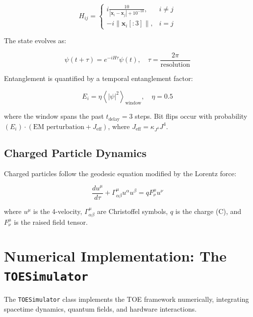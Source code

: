 \documentclass[12pt]{article}
\begin{document}
\begin{equation}
H_{ij} = \begin{cases} 
i \frac{10}{|\mathbf{x}_i - \mathbf{x}_j| + 10^{-10}}, & i \neq j \\
-i \|\mathbf{x}_i[:3]\|, & i = j 
\end{cases}
\label{eq:tetrahedral_hamiltonian}
\end{equation}

The state evolves as:

\begin{equation}
\psi(t + \tau) = e^{-i H \tau} \psi(t), \quad \tau = \frac{2\pi}{\text{resolution}}
\label{eq:quantum_evolution}
\end{equation}

Entanglement is quantified by a temporal entanglement factor:

\begin{equation}
E_i = \eta \left\langle |\psi|^2 \right\rangle_{\text{window}}, \quad \eta = 0.5
\label{eq:entanglement_factor}
\end{equation}

where the window spans the past \( t_{\text{delay}} = 3 \) steps. Bit flips occur with probability \( (E_i) \cdot (\text{EM perturbation} + J_{\text{eff}}) \), where \( J_{\text{eff}} = \kappa_{J^4} J^4 \).

\subsection{Charged Particle Dynamics}

Charged particles follow the geodesic equation modified by the Lorentz force:

\begin{equation}
\frac{du^{\mu}}{d\tau} + \Gamma_{\alpha \beta}^{\mu} u^{\alpha} u^{\beta} = q F_{\nu}^{\mu} u^{\nu}
\label{eq:charged_geodesic}
\end{equation}

where \( u^{\mu} \) is the 4-velocity, \( \Gamma_{\alpha \beta}^{\mu} \) are Christoffel symbols, \( q \) is the charge (C), and \( F_{\nu}^{\mu} \) is the raised field tensor.

\section{Numerical Implementation: The \texttt{TOESimulator}}
\label{sec:numerical}

The \texttt{TOESimulator} class implements the TOE framework numerically, integrating spacetime dynamics, quantum fields, and hardware interactions.
\end{document}
